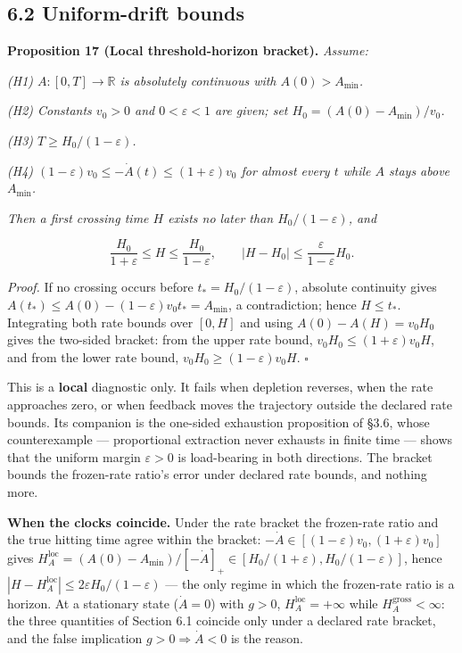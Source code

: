 \documentclass[11pt]{article}
\begin{document}
\subsection*{6.2 Uniform-drift bounds}\label{62-uniform-drift-bounds}

\textbf{Proposition 17 (Local threshold-horizon bracket).} \emph{Assume:}

\emph{(H1) \(A : [0,T] \to \mathbb{R}\) is absolutely continuous with \(A(0) > A_{\min}\).}

\emph{(H2) Constants \(v_0 > 0\) and \(0 < \varepsilon < 1\) are given; set \(H_0 = (A(0) - A_{\min})/v_0\).}

\emph{(H3) \(T \ge H_0/(1-\varepsilon)\).}

\emph{(H4) \((1-\varepsilon)v_0 \le -\dot A(t) \le (1+\allowbreak{}\varepsilon)v_0\) for almost every \(t\) while \(A\) stays above \(A_{\min}\).}

\emph{Then a first crossing time \(H\) exists no later than \(H_0/(1-\varepsilon)\), and} 

$$\frac{H_0}{1+\varepsilon} \le H \le \frac{H_0}{1-\varepsilon}, \qquad |H - H_0| \le \frac{\varepsilon}{1-\varepsilon}H_0.$$



\emph{Proof.} If no crossing occurs before \(t_* = H_0/(1-\varepsilon)\), absolute continuity gives \(A(t_*) \le A(0) - (1-\varepsilon)v_0 t_* =\allowbreak{} A_{\min}\), a contradiction; hence \(H \le t_*\). Integrating both rate bounds over \([0,H]\) and using \(A(0) - A(H) = v_0 H_0\) gives the two-sided bracket: from the upper rate bound, \(v_0 H_0 \le (1+\allowbreak{}\varepsilon) v_0 H\), and from the lower rate bound, \(v_0 H_0 \ge (1-\varepsilon) v_0 H\). \(\square\)

This is a \textbf{local} diagnostic only. It fails when depletion reverses, when the rate approaches zero, or when feedback moves the trajectory outside the declared rate bounds. Its companion is the one-sided exhaustion proposition of \S3.6, whose counterexample --- proportional extraction never exhausts in finite time --- shows that the uniform margin \(\varepsilon>0\) is load-bearing in both directions. The bracket bounds the frozen-rate ratio's error under declared rate bounds, and nothing more.

\textbf{When the clocks coincide.} Under the rate bracket the frozen-rate ratio and the true hitting time agree within the bracket: \(-\dot A \in [(1-\varepsilon)v_0,\allowbreak{} (1+\allowbreak{}\varepsilon)v_0]\) gives \(H_A^{\mathrm{loc}} =\allowbreak{} (A(0) - A_{\min})/[-\dot A]_+\allowbreak{} \in [H_0/(1+\allowbreak{}\varepsilon),\allowbreak{} H_0/(1-\varepsilon)]\), hence \(|H - H_A^{\mathrm{loc}}| \le 2\varepsilon H_0/(1-\varepsilon)\) --- the only regime in which the frozen-rate ratio is a horizon. At a stationary state (\(\dot A = 0\)) with \(g > 0\), \(H_A^{\mathrm{loc}} = +\infty\) while \(H_A^{\mathrm{gross}} < \infty\): the three quantities of Section 6.1 coincide only under a declared rate bracket, and the false implication \(g > 0 \Rightarrow \dot A < 0\) is the reason.
\end{document}
